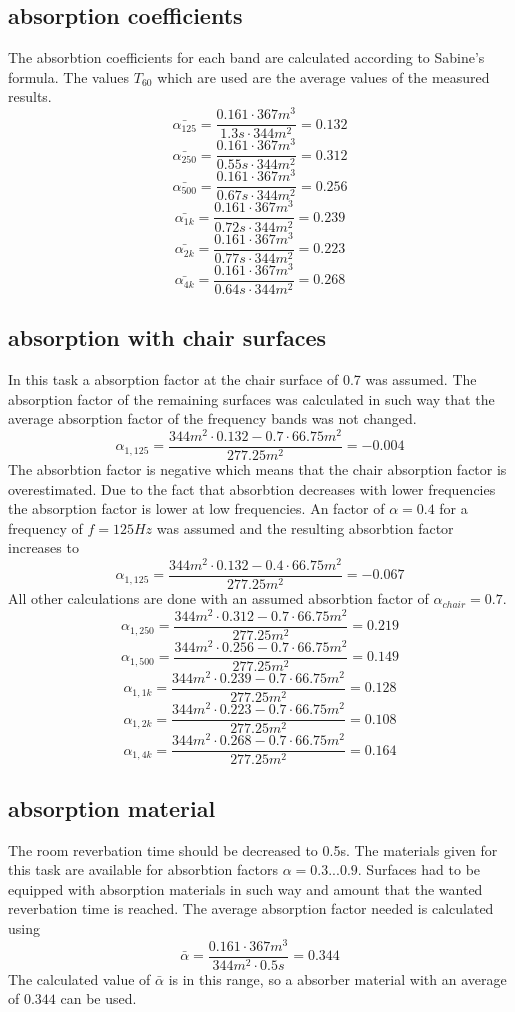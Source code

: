 \documentclass{article}
\begin{document}
\subsection{absorption coefficients}
The absorbtion coefficients for each band are calculated according to Sabine's formula. The values $T_{60}$ which are used are the average values of the measured results.
$$\bar{\alpha_{125}}=\frac{0.161\cdot 367m^3}{1.3s\cdot 344m^2}=0.132$$
$$\bar{\alpha_{250}}=\frac{0.161\cdot 367m^3}{0.55s\cdot 344m^2}=0.312$$
$$\bar{\alpha_{500}}=\frac{0.161\cdot 367m^3}{0.67s\cdot 344m^2}=0.256$$
$$\bar{\alpha_{1k}}=\frac{0.161\cdot 367m^3}{0.72s\cdot 344m^2}=0.239$$
$$\bar{\alpha_{2k}}=\frac{0.161\cdot 367m^3}{0.77s\cdot 344m^2}=0.223$$
$$\bar{\alpha_{4k}}=\frac{0.161\cdot 367m^3}{0.64s\cdot 344m^2}=0.268$$

\subsection{absorption with chair surfaces}
In this task a absorption factor at the chair surface of 0.7 was assumed. The absorption factor of the remaining surfaces was calculated in such way that the average absorption factor of the frequency bands was not changed.
$$\alpha_{1,125}=\frac{344m^2\cdot 0.132-0.7\cdot 66.75m^2}{277.25m^2}=-0.004$$
The absorbtion factor is negative which means that the chair absorption factor is overestimated. Due to the fact that absorbtion decreases with lower frequencies the absorption factor is lower at low frequencies. An factor of $\alpha=0.4$ for a frequency of $f=125Hz$ was assumed and the resulting absorbtion factor increases to
 $$\alpha_{1,125}=\frac{344m^2\cdot 0.132-0.4\cdot 66.75m^2}{277.25m^2}=-0.067$$
All other calculations are done with an assumed absorbtion factor of $\alpha_{chair}=0.7$.
 $$\alpha_{1,250}=\frac{344m^2\cdot 0.312-0.7\cdot 66.75m^2}{277.25m^2}=0.219$$
 $$\alpha_{1,500}=\frac{344m^2\cdot 0.256-0.7\cdot 66.75m^2}{277.25m^2}=0.149$$
 $$\alpha_{1,1k}=\frac{344m^2\cdot 0.239-0.7\cdot 66.75m^2}{277.25m^2}=0.128$$
 $$\alpha_{1,2k}=\frac{344m^2\cdot 0.223-0.7\cdot 66.75m^2}{277.25m^2}=0.108$$
 $$\alpha_{1,4k}=\frac{344m^2\cdot 0.268-0.7\cdot 66.75m^2}{277.25m^2}=0.164$$

\subsection{absorption material}
The room reverbation time should be decreased to 0.5s. The materials given for this task are available for absorbtion factors $\alpha=0.3 ... 0.9$. Surfaces had to be equipped with absorption materials in such way and amount that the wanted reverbation time is reached. The average absorption factor needed is calculated using
$$\bar{\alpha}=\frac{0.161\cdot 367m^3}{344m^2\cdot 0.5s}=0.344$$
The calculated value of $\bar{\alpha}$ is in this range, so a absorber material with an average of $0.344$ can be used.
\end{document}

